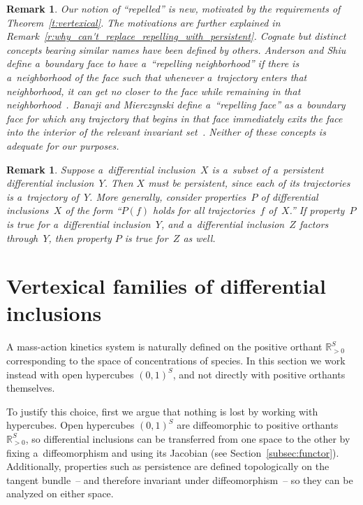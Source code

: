 \documentclass[11pt]{article}
\newtheorem{Remark}[Theorem]{Remark}
\begin{document}
\begin{Remark}
\label{r:repelled}
Our notion of ``repelled'' is new, motivated by the requirements of Theorem~\ref{t:vertexical}.
The motivations are further explained in Remark~\ref{r:why_can't_replace_repelling_with_persistent}.
Cognate but distinct concepts bearing similar names have been def\/ined by others.
Anderson and Shiu def\/ine a~boundary face to have a~``repelling neighborhood'' if there is a~neighborhood of the face
such that whenever a~trajectory enters that neighborhood, it can get no closer to the face while remaining in that
neighborhood~\cite{AndersonShiu10}.
Banaji and Mierczynski def\/ine a~``repelling face'' as a~boundary face for which any trajectory that begins in that
face immediately exits the face into the interior of the relevant invariant set~\cite{BanajiMier}.
Neither of these concepts is adequate for our purposes.
\end{Remark}
\begin{Remark}
\label{r:subsetTrajectory}
Suppose a~dif\/ferential inclusion~$X$ is a~subset of a~persistent dif\/ferential inclusion~$Y$.
Then $X$ must be persistent, since each of its trajectories is a~trajectory of~$Y$.
More generally, consider properties~$P$ of dif\/ferential inclusions~$X$ of the form ``$P(f)$ holds for all
trajectories~$f$ of~$X$.'' If property~$P$ is true for a~dif\/ferential inclusion~$Y$, and a~dif\/ferential
inclusion~$Z$ factors through~$Y$, then property $P$ is true for~$Z$ as well.
\end{Remark}

\section{Vertexical families of dif\/ferential inclusions}
\label{s:vertexical}

A mass-action kinetics system is naturally def\/ined on the positive orthant $\mathbb{R}_{>0}^S$ corresponding to the
space of concentrations of species.
In this section we work instead with open hypercubes $(0,1)^S$, and not directly with positive orthants themselves.

To justify this choice, f\/irst we argue that nothing is lost by working with hypercubes.
Open hypercubes $(0,1)^S$ are dif\/feomorphic to positive orthants $\mathbb{R}_{>0}^S$, so dif\/ferential inclusions can
be transferred from one space to the other by f\/ixing a~dif\/feomorphism and using its Jacobian (see
Section~\ref{subsec:functor}).
Additionally, properties such as persistence are def\/ined topologically on the tangent bundle~-- and therefore
invariant under dif\/feomorphism~-- so they can be analyzed on either space.
\end{document}

